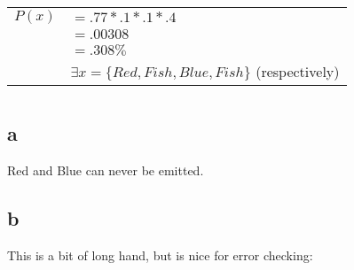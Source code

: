\documentclass[12pt]{article}
\begin{document}
\begin{tabular}{l l}
	$ P(x) $	&	$ = .77 * .1 * .1 * .4 $ 	\\
			&	$ = .00308 $		\\
			&	$ = .308\% $		\\
			&	$ \exists x = \{Red,Fish,Blue,Fish\} $ (respectively)	\\
\end{tabular}


\section{}

\subsection*{a}
Red and Blue can never be emitted.

\pagebreak

\subsection*{b}
This is a bit of long hand, but is nice for error checking:
\end{document}
